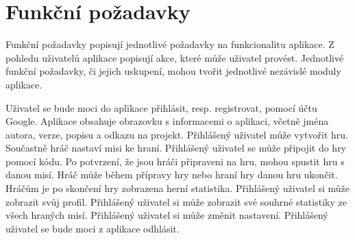 \section{Funkční požadavky}

Funkční požadavky popisují jednotlivé požadavky na funkcionalitu aplikace.
Z pohledu uživatelů aplikace popisují akce,
které může uživatel provést.
Jednotlivé funkční požadavky,
či jejich uskupení,
mohou tvořit jednotlivé nezávislé moduly aplikace.~\cite{fr_nfr}

\begin{enumerate}[label=\textbf{F\arabic*}, ref=F\arabic*]
Uživatel se bude moci do aplikace přihlásit, resp. registrovat,
pomocí účtu Google.
Aplikace obsahuje obrazovku s informacemi o aplikaci,
včetně jména autora, verze, popisu a odkazu na projekt.
Přihlášený uživatel může vytvořit hru.
Součastně hráč nastaví misi ke hraní.
Přihlášený uživatel se může připojit do hry pomocí kódu.
Po potvrzení, že jsou hráči připraveni na hru,
mohou spustit hru s danou misí.
Hráč může během přípravy hry nebo hraní hry danou hru ukončit.
Hráčům je po skončení hry zobrazena herní statistika.
Přihlášený uživatel si může zobrazit svůj profil.
Přihlášený uživatel si může zobrazit své souhrné statistiky
ze všech hraných misí.
    \label{req:settings}
Přihlášený uživatel si může změnit nastavení.
    \label{req:logout}
Přihlášený uživatel se bude moci z aplikace odhlásit.
\end{enumerate}
